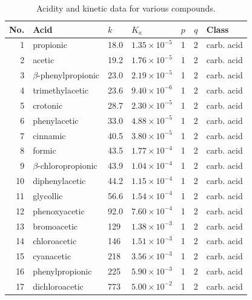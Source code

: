 \begin{longtable}{r l l l c c l}
\caption{Acidity and kinetic data for various compounds.}
\label{tab:aciddata}\\

{No.} & Acid & {$k$} & {$K_a$} & {$p$} & {$q$} & Class \\
\midrule

1  & {propionic}                & 18.0    & $1.35 \times 10^{-5}  $ & 1 & 2 & carb. acid \\
2  & {acetic}                   & 19.2    & $1.76 \times 10^{-5}  $ & 1 & 2 & carb. acid \\
3  & {$\beta$-phenylpropionic}  & 23.0    & $2.19 \times 10^{-5}  $ & 1 & 2 & carb. acid \\
4  & {trimethylacetic}          & 23.6    & $9.40 \times 10^{-6}  $ & 1 & 2 & carb. acid \\
5  & {crotonic}                 & 28.7    & $2.30 \times 10^{-5}  $ & 1 & 2 & carb. acid \\
6  & {phenylacetic}             & 33.0    & $4.88 \times 10^{-5}  $ & 1 & 2 & carb. acid \\
7  & {cinnamic}                 & 40.5    & $3.80 \times 10^{-5}  $ & 1 & 2 & carb. acid \\
8  & {formic}                   & 43.5    & $1.77 \times 10^{-4}  $ & 1 & 2 & carb. acid \\
9  & {$\beta$-chloropropionic}  & 43.9    & $1.04 \times 10^{-4}  $ & 1 & 2 & carb. acid \\
10 & {diphenylacetic}           & 44.2    & $1.15 \times 10^{-4}  $ & 1 & 2 & carb. acid \\
11 & {glycollic}                & 56.6    & $1.54 \times 10^{-4}  $ & 1 & 2 & carb. acid \\
12 & {phenoxyacetic}            & 92.0    & $7.60 \times 10^{-4}  $ & 1 & 2 & carb. acid \\
13 & {bromoacetic}              & 129     & $1.38 \times 10^{-3}  $ & 1 & 2 & carb. acid \\
14 & {chloroacetic}             & 146     & $1.51 \times 10^{-3}  $ & 1 & 2 & carb. acid \\
15 & {cyanacetic}               & 218     & $3.56 \times 10^{-3}  $ & 1 & 2 & carb. acid \\
16 & {phenylpropionic}          & 225     & $5.90 \times 10^{-3}  $ & 1 & 2 & carb. acid \\
17 & {dichloroacetic}           & 773     & $5.00 \times 10^{-2}  $ & 1 & 2 & carb. acid \\

\end{longtable}

